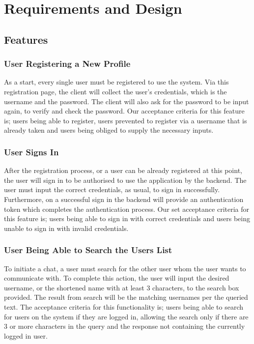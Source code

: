 \documentclass[11pt,a4paper]{report}
\begin{document}
\chapter{Requirements and Design}

\section{Features}
\subsection{User Registering a New Profile}
As a start, every single user must be registered to use the system. Via this registration page, the client will collect the user’s credentials, which is the username and the password. The client will also ask for the password to be input again, to verify and check the password. Our acceptance criteria for this feature is; users being able to register, users prevented to register via a username that is already taken and users being obliged to supply the necessary inputs.
\subsection{User Signs In}
After the registration process, or a user can be already registered at this point, the user will sign in to be authorised to use the application by the backend. The user must input the correct credentials, as usual, to sign in successfully. Furthermore, on a successful sign in the backend will provide an authentication token which completes the authentication process. Our set acceptance criteria for this feature is; users being able to sign in with correct credentials and users being unable to sign in with invalid credentials.
\subsection{User Being Able to Search the Users List}
To initiate a chat, a user must search for the other user whom the user wants to communicate with. To complete this action, the user will input the desired username, or the shortened name with at least 3 characters, to the search box provided. The result from search will be the matching usernames per the queried text. The acceptance criteria for this functionality is; users being able to search for users on the system if they are logged in, allowing the search only if there are 3 or more characters in the query and the response not containing the currently logged in user.
\end{document}
